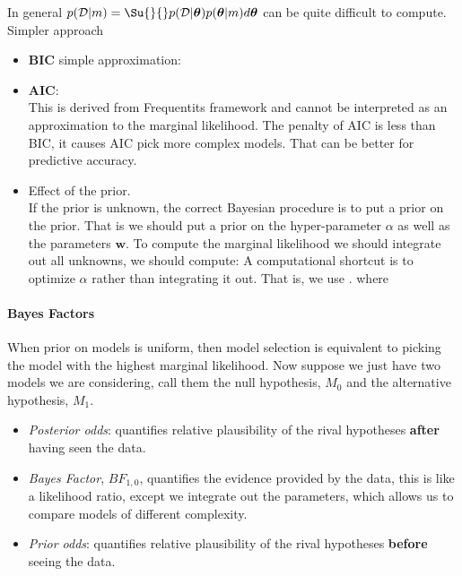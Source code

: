 In general $p(\mathcal{D}|m) = \Su{}{}p(\mathcal{D}|\bm{\theta})p(\bm{\theta}|m)d\bm{
\theta}$ can be quite difficult to compute. 
Simpler approach
\begin{itemize}
	\item \textbf{BIC} simple approximation:
	\item \textbf{AIC}:
		\\
		This is derived from Frequentits framework and cannot be interpreted as 
		an approximation to the marginal likelihood. The penalty of AIC is less
		than BIC, it causes AIC pick more complex models. That can be better for 
		predictive accuracy.
	\item Effect of the prior.\\
		If the prior is unknown, the correct Bayesian procedure is to put a prior
		on the prior. That is we should put a prior on the hyper-parameter 
		$\alpha$ as well as the parameters $\bm{w}$. To compute the marginal 
		likelihood we should integrate out all unknowns, we should compute:
		A computational shortcut is to optimize $\alpha$ rather than integrating
		it out. That is, we use .
		where 
\end{itemize}
\paragraph{Bayes Factors}
When prior on models is uniform, then model selection is equivalent to picking the model
with the highest marginal likelihood. Now suppose we just have two models we are 
considering, call them the null hypothesis, $M_{0}$ and the alternative hypothesis,
$M_{1}$.\\
\begin{itemize}
    \item \emph{Posterior odds}: quantifies relative plausibility of the rival hypotheses
        \textbf{after} having seen the data.
    \item \emph{Bayes Factor}, $BF_{1,0}$, quantifies the evidence provided by the data, 
        this is like a likelihood ratio, except we integrate out the parameters, which 
        allows us to compare models of different complexity.
    \item \emph{Prior odds}: quantifies relative plausibility of the rival hypotheses
        \textbf{before} seeing the data.
\end{itemize}

